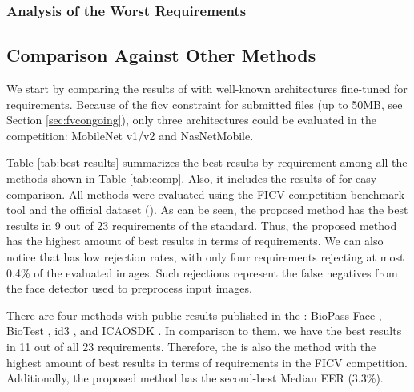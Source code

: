 

\subsubsection{Analysis of the Worst Requirements}


\subsection{Comparison Against Other Methods}

We start by comparing the results of \methodname with well-known architectures fine-tuned for \icao requirements. Because of the \acs{ficv} constraint for submitted files (up to 50MB, see Section \ref{sec:fvcongoing}), only three architectures could be evaluated in the competition: MobileNet v1/v2 and NasNetMobile. 

Table \ref{tab:best-results} summarizes the best results by requirement among all the methods shown in Table \ref{tab:comp}. Also, it includes the results of \methodname for easy comparison. All methods were evaluated using the FICV competition benchmark tool and the official dataset (\ficvofficial). As can be seen, the proposed method has the best results in 9 out of 23 requirements of the \icao standard. Thus, the proposed method has the highest amount of best results in terms of requirements. We can also notice that \methodname has low rejection rates, with only four requirements rejecting at most 0.4\% of the evaluated images. Such rejections represent the false negatives from the face detector used to preprocess input images.



There are four methods with public results published in the \fvcongoing: BioPass Face \citep{fvcVsoft}, BioTest \citep{fvcBioTest}, id3 \citep{fvcICAOCompliance}, and ICAOSDK \citep{fvcSeamfix}. In comparison to them, we have the best results in 11 out of all 23 requirements. Therefore, the \methodname is also the method with the highest amount of best results in terms of requirements in the FICV competition. Additionally, the proposed method has the second-best Median EER (3.3\%).

